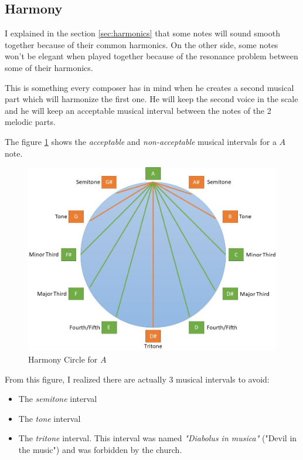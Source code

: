 \documentclass[12pt]{report}
\begin{document}
\subsection{Harmony}
\label{sec:harmony}

I explained in the section \ref{sec:harmonics} that some notes will sound smooth together because of their common harmonics.
On the other side, some notes won't be elegant when played together because of the resonance problem between some of their harmonics.

This is something every composer has in mind when he creates a second musical part which will harmonize the first one.
He will keep the second voice in the scale and he will keep an acceptable musical interval between the notes of the 2 melodic parts.

The figure \ref{fig:harmony_circle} shows the \textit{acceptable} and \textit{non-acceptable} musical intervals for a $A$ note.

\begin{figure}[ht]
    \centering
    \includegraphics[width=\textwidth]{images/music/circle_harmony.jpg}
    \caption{Harmony Circle for $A$}
    \label{fig:harmony_circle}
\end{figure}

From this figure, I realized there are actually 3 musical intervals to avoid:
\begin{itemize}
    \item The \textit{semitone} interval
    \item The \textit{tone} interval
    \item The \textit{tritone} interval. This interval was named \textit{"Diabolus in musica"} ("Devil in the music") and was forbidden by the church.
\end{itemize}
\end{document}
